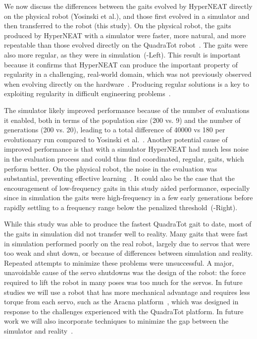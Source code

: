 We now discuss the differences between the gaits evolved by HyperNEAT directly on the physical robot (Yosinski et al.), and those first evolved in a simulator and then transferred to the robot (this study). 
On the physical robot, the gaits produced by HyperNEAT with a simulator were faster, more natural, and more repeatable than those evolved directly on the QuadraTot robot~\cite{yos:clune}. The gaits were also more regular, as they were in simulation~(-Left). This result is important because it confirms that HyperNEAT can produce the important property of
regularity in a challenging, real-world domain, which was not previously observed when
evolving directly on the hardware~\cite{yos:clune}. Producing regular solutions is a key to exploiting regularity in difficult engineering problems~\cite{clune2011performance}. 


The simulator likely improved performance because of the number of evaluations it enabled, both in terms of the population size (200 vs. 9) and the number of generations (200 vs. 20), leading
to a total difference of 40000 vs 180 per evolutionary run compared to Yosinski et al.~\cite{yos:clune}. Another
potential cause of improved performance is that with a simulator
HyperNEAT had much less noise in the evaluation process and could thus find coordinated, regular, gaits, which perform better. On the physical robot, the noise in the evaluation was
substantial, preventing effective learning~\cite{yos:clune}. It could also be the case that 
the encouragement of low-frequency gaits in this study
aided performance, especially since in simulation the gaits were
high-frequency in a few early generations before rapidly settling to a
frequency range below the penalized threshold~(-Right).



While this study was able to produce the fastest QuadraTot gait to
date, most of the gaits in simulation did not transfer well to
reality. Many gaits that were fast in simulation performed
poorly on the real robot, largely due to servos that were too weak and
shut down, or because of differences between simulation and
reality. Repeated attempts to minimize these problems were
unsuccessful.  A major, unavoidable cause of the servo shutdowns was
the design of the robot: the force required to lift the robot in many
poses was too much for the servos. In future studies we will use a
robot that has more mechanical advantage and requires less torque from
each servo, such as the Aracna platform~\cite{lohmann2012aracna},
which was designed in response to the challenges experienced with the
QuadraTot platform. In future work we will also incorporate techniques to minimize the gap between the simulator and reality~\cite{koos2010crossing,bongard,zagal}.











